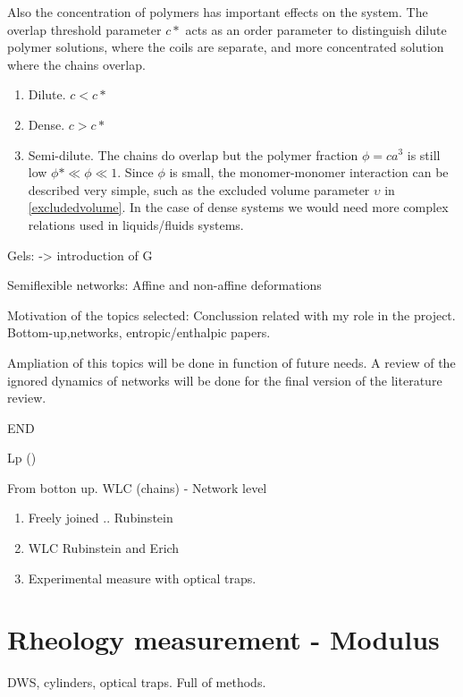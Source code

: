 Also the concentration of polymers has important effects on the system. The
overlap threshold parameter $c*$ acts as an order parameter to distinguish dilute
polymer solutions, where the coils are separate, and more concentrated solution
where the chains overlap.
\begin{enumerate}
  \item Dilute. $c<c*$
  \item Dense. $c>c*$
  \item Semi-dilute. The chains do overlap but the polymer fraction
  $\phi=ca^3$ is still low $\phi*\ll\phi\ll1$. Since $\phi$ is small, the monomer-monomer interaction can
  be described very simple, such as the excluded volume parameter $\upsilon$ in
  \ref{excludedvolume}. In the case of dense systems we would need more complex
  relations used in liquids/fluids systems. 
\end{enumerate}


Gels: -> introduction of G

Semiflexible networks: Affine and non-affine deformations

Motivation of the topics selected:
Conclussion related with my role in the project. Bottom-up,networks,
entropic/enthalpic papers.

Ampliation of this topics will be done in function of future needs. A review of
the ignored dynamics of networks will be done for the final version of the
literature review.

END




\gls{Lp}  
 (\citet{storm_nonlinear_2005})
\citet{stein_algorithm_2008}




From botton up. WLC (chains) - Network level
\begin{enumerate}
  \item Freely joined .. Rubinstein
  \item WLC Rubinstein and Erich
  \item Experimental measure with optical traps.
\end{enumerate}



\section{Rheology measurement - Modulus}
DWS, cylinders, optical traps. Full of methods.




